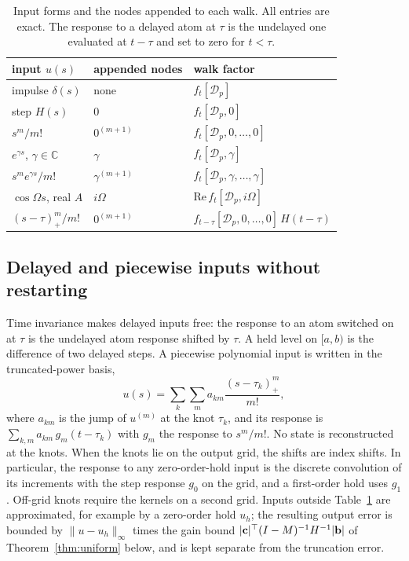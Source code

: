 \documentclass[aps,pra,superscriptaddress,floatfix,longbibliography,twocolumn]{revtex4-2}
\newcommand{\bb}{{\bf b}}
\newcommand{\bc}{{\bf c}}
\begin{document}
\begin{table}[t]
\caption{Input forms and the nodes appended to each walk. All entries are exact. The response to a delayed atom at $\tau$ is the undelayed one evaluated at $t-\tau$ and set to zero for $t<\tau$.}\label{tab:inputs}
\footnotesize\setlength{\tabcolsep}{2pt}
\begin{ruledtabular}
\begin{tabular}{lll}
input $u(s)$ & appended nodes & walk factor\\\hline
impulse $\delta(s)$ & none & $f_t[\mathcal{D}_p]$\\
step $H(s)$ & $0$ & $f_t[\mathcal{D}_p,0]$\\
$s^m/m!$ & $0^{(m+1)}$ & $f_t[\mathcal{D}_p,0,\dots,0]$\\
$e^{\gamma s}$, $\gamma\in\mathbb{C}$ & $\gamma$ & $f_t[\mathcal{D}_p,\gamma]$\\
$s^me^{\gamma s}/m!$ & $\gamma^{(m+1)}$ & $f_t[\mathcal{D}_p,\gamma,\dots,\gamma]$\\
$\cos\Omega s$, real $A$ & $i\Omega$ & $\mathrm{Re}\,f_t[\mathcal{D}_p,i\Omega]$\\
$(s-\tau)_+^m/m!$ & $0^{(m+1)}$ & $f_{t-\tau}[\mathcal{D}_p,0,\dots,0]\,H(t-\tau)$\\
\end{tabular}
\end{ruledtabular}
\end{table}

\subsection{Delayed and piecewise inputs without restarting}\label{sec:piecewise}
Time invariance makes delayed inputs free: the response to an atom switched on at $\tau$ is the undelayed atom response shifted by $\tau$. A held level on $[a,b)$ is the difference of two delayed steps. A piecewise polynomial input is written in the truncated-power basis,
\begin{equation}\label{eq:truncpow}
u(s)=\sum_k\sum_{m}a_{km}\frac{(s-\tau_k)_+^m}{m!},
\end{equation}
where $a_{km}$ is the jump of $u^{(m)}$ at the knot $\tau_k$, and its response is $\sum_{k,m}a_{km}\,g_m(t-\tau_k)$ with $g_m$ the response to $s^m/m!$. No state is reconstructed at the knots. When the knots lie on the output grid, the shifts are index shifts. In particular, the response to any zero-order-hold input is the discrete convolution of its increments with the step response $g_0$ on the grid, and a first-order hold uses $g_1$. Off-grid knots require the kernels on a second grid. Inputs outside Table~\ref{tab:inputs} are approximated, for example by a zero-order hold $u_h$; the resulting output error is bounded by $\|u-u_h\|_\infty$ times the gain bound $|\bc|^\top(I-M)^{-1}H^{-1}|\bb|$ of Theorem~\ref{thm:uniform} below, and is kept separate from the truncation error.
\end{document}
